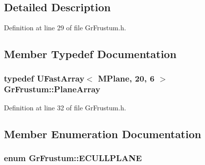 \begin{CompactItemize}
\subsection{Detailed Description}


Definition at line 29 of file GrFrustum.h.

\subsection{Member Typedef Documentation}
\hypertarget{class_gr_frustum_0329f74100ff09e4eb6e1605ce9dcb35}{
\subsubsection[{PlaneArray}]{\setlength{\rightskip}{0pt plus 5cm}typedef {\bf UFastArray}$<$ {\bf MPlane}, 20, 6 $>$ {\bf GrFrustum::PlaneArray}}}
\label{class_gr_frustum_0329f74100ff09e4eb6e1605ce9dcb35}




Definition at line 32 of file GrFrustum.h.

\subsection{Member Enumeration Documentation}
\hypertarget{class_gr_frustum_75e33130cc18abc48f5f210454a62184}{
\subsubsection[{ECULLPLANE}]{\setlength{\rightskip}{0pt plus 5cm}enum {\bf GrFrustum::ECULLPLANE}}}
\label{class_gr_frustum_75e33130cc18abc48f5f210454a62184}



\end{CompactItemize}
